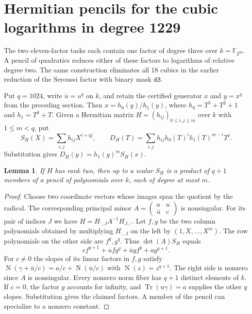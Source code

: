 \documentclass[11pt]{article}
\newtheorem{lemma}[theorem]{Lemma}
\begin{document}
\section{Hermitian pencils for the cubic logarithms in degree 1229}
\label{sec:hermitian-descent}

The two eleven-factor tasks each contain one factor of degree three
over \(k=\mathbb F_{2^{20}}\). A pencil of quadratics reduces either
of these factors to logarithms of relative degree two. The same
construction eliminates all 18 cubics in the earlier reduction of
the Seroussi factor with binary mask \(\mathtt{d3}\).

Put \(q=1024\), write \(\bar u=u^q\) on \(k\), and retain the
certified generator \(x\) and \(y=x^q\) from the preceding section.
Then \(x=h_0(y)/h_1(y)\), where \(h_0=T^5+T^2+1\) and \(h_1=T^3+T\).
Given a Hermitian matrix \(H=(h_{ij})_{0\le i,j\le m}\) over \(k\)
with \(1\le m<q\), put
\[
 S_H(X)=\sum_{i,j}h_{ij}X^{i+qj},
 \qquad D_H(T)=\sum_{i,j}h_{ij}h_0(T)^i h_1(T)^{m-i}T^j .
\]
Substitution gives \(D_H(y)=h_1(y)^mS_H(x)\).

\begin{lemma}\label{lem:hermitian-pencil}
If \(H\) has rank two, then up to a scalar \(S_H\) is a product
of \(q+1\) members of a pencil of polynomials over \(k\), each of
degree at most \(m\).
\end{lemma}
\begin{proof}
Choose two coordinate vectors whose images span the quotient by the
radical. The corresponding principal minor
\(A=\left(\begin{smallmatrix}a&u\\\bar u&c\end{smallmatrix}\right)\)
is nonsingular. For its pair of indices \(J\) we have
\(H=H_{:,J}A^{-1}H_{J,:}\). Let \(f,g\) be the two column polynomials
obtained by multiplying \(H_{:,J}\) on the left by
\((1,X,\ldots,X^m)\). The row polynomials on the other side are
\(f^q,g^q\). Thus \(\det(A)S_H\) equals
\[
 c f^{q+1}+u f g^q+\bar u g f^q+a g^{q+1}.
\]
For \(c\ne0\) the slopes of its linear factors in \(f,g\) satisfy
\(\operatorname{N}(\gamma+\bar u/c)=a/c+\operatorname{N}(\bar u/c)\)
with \(\operatorname{N}(z)=z^{q+1}\). The right side is nonzero
since \(A\) is nonsingular. Every nonzero norm fiber has \(q+1\)
distinct elements of \(k\). If \(c=0\), the factor \(g\) accounts for
infinity, and \(\operatorname{Tr}(u\gamma)=a\) supplies the other
\(q\) slopes. Substitution gives the claimed factors. A member of
the pencil can specialize to a nonzero constant.
\end{proof}
\end{document}
